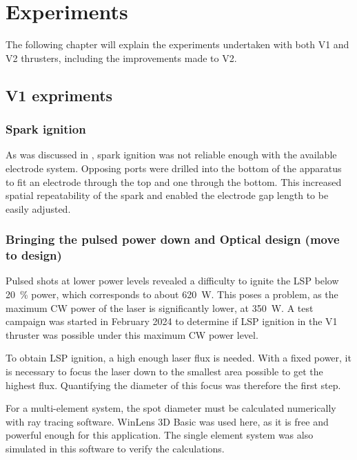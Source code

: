 \chapter{Experiments}

    The following chapter will explain the experiments undertaken with both V1 and V2 thrusters, including the improvements made to V2.

    \section{V1 expriments}

        \subsection{Spark ignition}
            
            As was discussed in \textcite{duplayArgonLaserPlasmaThruster2024a}, spark ignition was not reliable enough with the available electrode system. Opposing ports were drilled into the bottom of the apparatus to fit an electrode through the top and one through the bottom. This increased spatial repeatability of the spark and enabled the electrode gap length to be easily adjusted.

        \subsection{Bringing the pulsed power down and Optical design (move to design)} \label{sec:pulse_power_down_V1}
            
            Pulsed shots at lower power levels revealed a difficulty to ignite the LSP below \qty{20}{\%} power, which corresponds to about \qty{620}{W}. This poses a problem, as the maximum CW power of the laser is significantly lower, at \qty{350}{W}. A test campaign was started in February 2024 to determine if LSP ignition in the V1 thruster was possible under this maximum CW power level.
            
            To obtain LSP ignition, a high enough laser flux is needed. With a fixed power, it is necessary to focus the laser down to the smallest area possible to get the highest flux. Quantifying the diameter of this focus was therefore the first step. 


            For a multi-element system, the spot diameter must be calculated numerically with ray tracing software. WinLens 3D Basic \cite{winlens} was used here, as it is free and powerful enough for this application. The single element system was also simulated in this software to verify the calculations.

